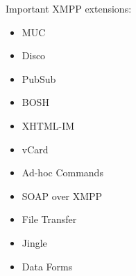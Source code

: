 Important XMPP extensions:

\begin{itemize}
\item MUC
\item Disco
\item PubSub
\item BOSH
\item XHTML-IM
\item vCard
\item Ad-hoc Commands
\item SOAP over XMPP
\item File Transfer
\item Jingle
\item Data Forms
\end{itemize}
